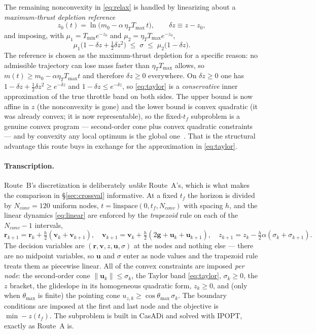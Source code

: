 \documentclass[11pt]{article}
\newcommand{\rvec}{\mathbf{r}}
\newcommand{\vvec}{\mathbf{v}}
\newcommand{\uvec}{\mathbf{u}}
\newcommand{\gvec}{\mathbf{g}}
\newcommand{\Tmin}{T_{\min}}
\newcommand{\Tmax}{T_{\max}}
\newcommand{\etaT}{\eta_T}
\begin{document}
The remaining nonconvexity in \eqref{eq:relax} is handled by linearizing
about a \emph{maximum-thrust depletion reference}
%
\begin{equation}
z_0(t) = \ln\!\big( m_0 - \alpha\, \etaT \Tmax\, t \big),
\qquad
\delta z \equiv z - z_0 ,
\label{eq:z0}
\end{equation}
%
and imposing, with $\mu_1 = \Tmin e^{-z_0}$ and $\mu_2 = \etaT \Tmax
e^{-z_0}$,
%
\begin{equation}
\mu_1\Big(1 - \delta z + \tfrac{1}{2}\delta z^2\Big)
\;\le\; \sigma \;\le\;
\mu_2 \big(1 - \delta z\big) .
\label{eq:taylor}
\end{equation}
%
The reference is chosen as the maximum-thrust depletion for a specific
reason: no admissible trajectory can lose mass faster than $\etaT\Tmax$
allows, so $m(t) \ge m_0 - \alpha \etaT \Tmax t$ and therefore $\delta z \ge
0$ everywhere. On $\delta z \ge 0$ one has $1 - \delta z + \tfrac12 \delta
z^2 \ge e^{-\delta z}$ and $1 - \delta z \le e^{-\delta z}$, so
\eqref{eq:taylor} is a \emph{conservative} inner approximation of the true
throttle band on both sides. The upper bound is now affine in $z$ (the
nonconvexity is gone) and the lower bound is convex quadratic (it was
already convex; it is now representable), so the fixed-$t_f$ subproblem is
a genuine convex program --- second-order cone plus convex quadratic
constraints --- and by convexity any local optimum is the global
one~\cite{boyd2004}. That is the structural advantage this route buys in
exchange for the approximation in \eqref{eq:taylor}.

\paragraph{Transcription.}
Route~B's discretization is deliberately \emph{unlike} Route~A's, which is
what makes the comparison in \S\ref{sec:crossval} informative. At a fixed
$t_f$ the horizon is divided by $N_{conv} = 120$ uniform nodes,
$t = \mathrm{linspace}(0, t_f, N_{conv})$ with spacing $h$, and the linear
dynamics \eqref{eq:linear} are enforced by the \emph{trapezoid} rule on each
of the $N_{conv} - 1$ intervals,
%
\begin{equation}
\rvec_{k+1} = \rvec_k + \tfrac{h}{2}(\vvec_k + \vvec_{k+1}),
\quad
\vvec_{k+1} = \vvec_k + \tfrac{h}{2}(2\gvec + \uvec_k + \uvec_{k+1}),
\quad
z_{k+1} = z_k - \tfrac{h}{2}\alpha(\sigma_k + \sigma_{k+1}) .
\label{eq:trap}
\end{equation}
%
The decision variables are $(\rvec, \vvec, z, \uvec, \sigma)$ at the nodes
and nothing else --- there are no midpoint variables, so $\uvec$ and
$\sigma$ enter as node values and the trapezoid rule treats them as
piecewise linear. All of the convex constraints are imposed
\emph{per node}: the second-order cone $\lVert\uvec_k\rVert \le \sigma_k$,
the Taylor band \eqref{eq:taylor}, $\sigma_k \ge 0$, the $z$ bracket, the
glideslope in its homogeneous quadratic form, $z_k \ge 0$, and (only when
$\theta_{\max}$ is finite) the pointing cone $u_{z,k} \ge
\cos\theta_{\max}\,\sigma_k$. The boundary conditions are imposed at the
first and last node and the objective is $\min -z(t_f)$. The subproblem is
built in CasADi and solved with IPOPT, exactly as Route~A is.
\end{document}

